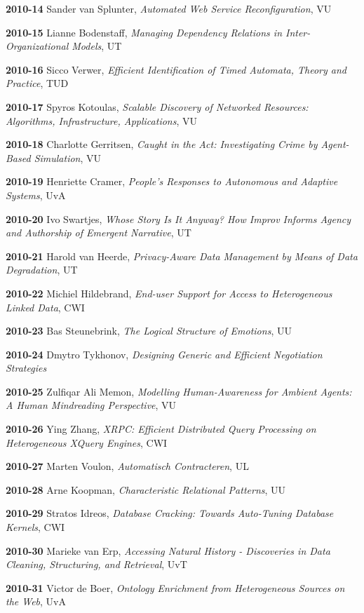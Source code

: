 \begin{multicols}{2}
\textbf{2010-14}   Sander van Splunter, \textit{Automated Web Service Reconfiguration}, VU

\textbf{2010-15}   Lianne Bodenstaff, \textit{Managing Dependency Relations in Inter-Organizational Models}, UT

\textbf{2010-16}   Sicco Verwer, \textit{Efficient Identification of Timed Automata, Theory and Practice}, TUD

\textbf{2010-17}   Spyros Kotoulas, \textit{Scalable Discovery of Networked Resources: Algorithms, Infrastructure, Applications}, VU

\textbf{2010-18}   Charlotte Gerritsen, \textit{Caught in the Act: Investigating Crime by Agent-Based Simulation}, VU

\textbf{2010-19}   Henriette Cramer, \textit{People's Responses to Autonomous and Adaptive Systems}, UvA

\textbf{2010-20}   Ivo Swartjes, \textit{Whose Story Is It Anyway? How Improv Informs Agency and Authorship of Emergent Narrative}, UT

\textbf{2010-21}   Harold van Heerde, \textit{Privacy-Aware Data Management by Means of Data Degradation}, UT

\textbf{2010-22}   Michiel Hildebrand, \textit{End-user Support for Access to Heterogeneous Linked Data}, CWI

\textbf{2010-23}   Bas Steunebrink, \textit{The Logical Structure of Emotions}, UU

\textbf{2010-24}   Dmytro Tykhonov, \textit{Designing Generic and Efficient Negotiation Strategies}

\textbf{2010-25}   Zulfiqar Ali Memon, \textit{Modelling Human-Awareness for Ambient Agents: A Human Mindreading Perspective}, VU

\textbf{2010-26}   Ying Zhang, \textit{XRPC: Efficient Distributed Query Processing on Heterogeneous XQuery Engines}, CWI

\textbf{2010-27}   Marten Voulon, \textit{Automatisch Contracteren}, UL

\textbf{2010-28}   Arne Koopman, \textit{Characteristic Relational Patterns}, UU

\textbf{2010-29}   Stratos Idreos, \textit{Database Cracking: Towards Auto-Tuning Database Kernels}, CWI

\textbf{2010-30}   Marieke van Erp, \textit{Accessing Natural History - Discoveries in Data Cleaning, Structuring, and Retrieval}, UvT

\textbf{2010-31}   Victor de Boer, \textit{Ontology Enrichment from Heterogeneous Sources on the Web}, UvA


\end{multicols}
